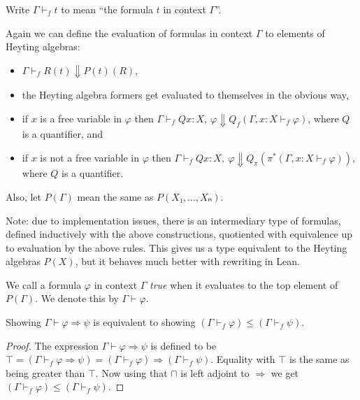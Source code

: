 Write \(Γ ⊢_f t\) to mean ``the formula \(t\) in context \(Γ\)''.

Again we can define the evaluation of formulas in context \(Γ\) to elements of Heyting algebras:
\begin{itemize}
    \item \(Γ ⊢_f R(t) \Downarrow P(t)(R)\),
    \item the Heyting algebra formers get evaluated to themselves in the obvious way,
    \item if \(x\) is a free variable in \(φ\) then \(Γ ⊢_f Q x : X,\ φ \Downarrow Q_f (Γ, x : X ⊢_f φ)\), where \(Q\) is a quantifier, and
    \item if \(x\) is not a free variable in \(φ\) then \(Γ ⊢_f Q x : X,\ φ \Downarrow Q_π(π^*(Γ, x : X ⊢_f φ))\), where \(Q\) is a quantifier.
\end{itemize}

Also, let \(P(Γ)\) mean the same as \(P(X₁,…,Xₙ)\).

Note: due to implementation issues, there is an intermediary type of formulas, defined inductively with the above constructions, quotiented with equivalence up to evaluation by the above rules. This gives us a type equivalent to the Heyting algebras \(P(X)\), but it behaves much better with rewriting in Lean.

\begin{definition}[Truth]
    We call a formula \(φ\) in context \(Γ\) \emph{true} when it evaluates to the top element of \(P(Γ)\). We denote this by \(Γ ⊢ φ\).
\end{definition}

\begin{lemma}
    Showing \(Γ ⊢ φ ⇒ ψ\) is equivalent to showing \((Γ ⊢_f φ) ≤ (Γ ⊢_f ψ)\).
\end{lemma}
\begin{proof}
    The expression \(Γ ⊢ φ ⇒ ψ\) is defined to be \(⊤ = (Γ ⊢_f φ ⇒ ψ) = (Γ ⊢_f φ) ⇒ (Γ ⊢_f ψ)\).
    Equality with \(⊤\) is the same as being greater than \(⊤\). Now using that \(⊓\) is left adjoint to \(⇒\) we get \((Γ ⊢_f φ) ≤ (Γ ⊢_f ψ)\).
\end{proof}


